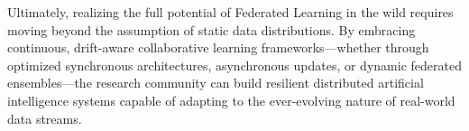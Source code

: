 \documentclass[journal]{IEEEtran}
\begin{document}
Ultimately, realizing the full potential of Federated Learning in the wild requires moving beyond the assumption of static data distributions. By embracing continuous, drift-aware collaborative learning frameworks—whether through optimized synchronous architectures, asynchronous updates, or dynamic federated ensembles—the research community can build resilient distributed artificial intelligence systems capable of adapting to the ever-evolving nature of real-world data streams.



\end{document}
